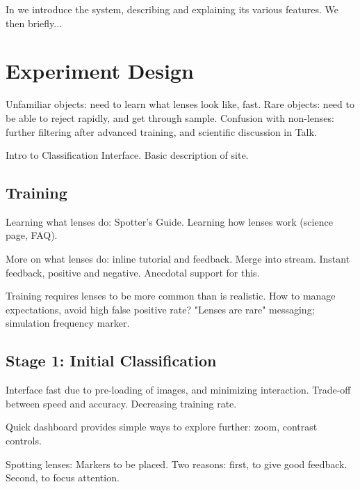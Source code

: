 \documentclass[useAMS,usenatbib,a4paper]{mn2e}
\begin{document}
In  we introduce the \sw system, describing and
explaining its various features. We then briefly...




\section{Experiment Design}
\label{sec:design}

Unfamiliar objects: need to learn what lenses look like, fast. Rare
objects: need to be able to reject rapidly, and get through sample.
Confusion with non-lenses: further filtering after advanced training, and 
scientific discussion in Talk.

Intro to Classification Interface. Basic description of site. 


\subsection{Training}
\label{sec:design:training}

Learning what lenses do: Spotter's Guide. Learning how
lenses work (science page, FAQ). 

More on what lenses do: inline tutorial and feedback. 
Merge into stream. Instant feedback, positive and
negative. Anecdotal support for this.

Training requires lenses to be more common than is realistic. How to manage
expectations, avoid high false positive rate? "Lenses are rare" messaging;
simulation frequency marker.


\subsection{Stage 1: Initial Classification}
\label{sec:design:stage1}

Interface fast due to pre-loading of images, and minimizing interaction.
Trade-off between speed and accuracy. Decreasing training rate.

Quick dashboard provides simple ways to explore further: zoom, contrast
controls.

Spotting lenses: Markers to be placed. Two reasons: first, to give good
feedback. Second, to focus attention.
\end{document}
